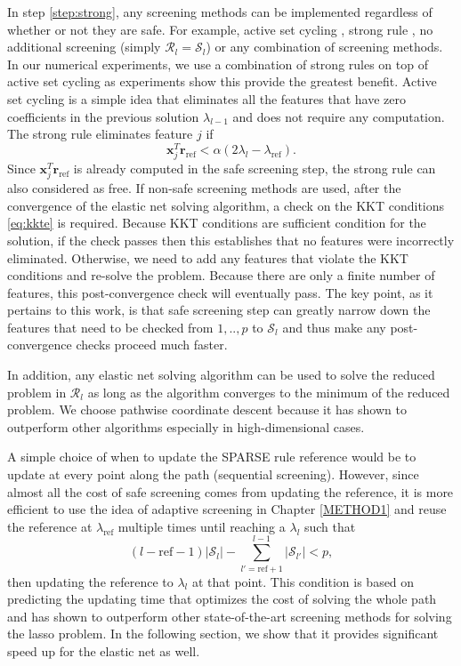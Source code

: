 In step \ref{step:strong}, any screening methods can be implemented regardless of whether or not they are safe. For example, active set cycling \citep{lee2007efficient}, strong rule \citep{Tibshirani2012}, no additional screening (simply $\mathcal{R}_l=\mathcal{S}_l$) or any combination of screening methods. In our numerical experiments, we use a combination of strong rules on top of active set cycling as experiments show this provide the greatest benefit. Active set cycling is a simple idea that eliminates all the features that have zero coefficients in the previous solution $\lambda_{l-1}$ and does not require any computation. The strong rule eliminates feature $j$ if
\begin{equation}
    \label{eq:strong}
    \boldsymbol x_j^T\boldsymbol r_\textrm{ref}<\alpha(2\lambda_l-\lambda_\textrm{ref}).
\end{equation}
Since $\boldsymbol x_j^T\boldsymbol r_\textrm{ref}$ is already computed in the safe screening step, the strong rule can also considered as free. If non-safe screening methods are used, after the convergence of the elastic net solving algorithm, a check on the KKT conditions \eqref{eq:kkte} is required. Because KKT conditions are sufficient condition for the solution, if the check passes then this establishes that no features were incorrectly eliminated. Otherwise, we need to add any features that violate the KKT conditions and re-solve the problem. Because there are only a finite number of features, this post-convergence check will eventually pass. The key point, as it pertains to this work, is that safe screening step can greatly narrow down the features that need to be checked from $1,..,p$ to $\mathcal{S}_l$ and thus make any post-convergence checks proceed much faster.

In addition, any elastic net solving algorithm can be used to solve the reduced problem in $\mathcal{R}_l$ as long as the algorithm converges to the minimum of the reduced problem. We choose pathwise coordinate descent \citep{friedman2007pathwise} because it has shown to outperform other algorithms especially in high-dimensional cases.

A simple choice of when to update the SPARSE rule reference would be to update at every point along the path (sequential screening). However, since almost all the cost of safe screening comes from updating the reference, it is more efficient to use the idea of adaptive screening in Chapter \ref{METHOD1} and reuse the reference at $\lambda_\textrm{ref}$ multiple times until reaching a $\lambda_l$ such that
\begin{equation}
    (l-\textrm{ref}-1)|\mathcal{S}_{l}|-\sum_{l'=\textrm{ref}+1}^{l-1}|\mathcal{S}_{l'}|<p,
\end{equation}
then updating the reference to $\lambda_l$ at that point. This condition is based on predicting the updating time that optimizes the cost of solving the whole path and has shown to outperform other state-of-the-art screening methods for solving the lasso problem. In the following section, we show that it provides significant speed up for the elastic net as well.

